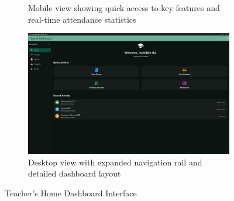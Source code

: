 \begin{figure}[H]
\begin{subfigure}[b]{0.35\textwidth}
        \caption{Mobile view showing quick access to key features and real-time attendance statistics}
    \end{subfigure}
    \hfill
    \begin{subfigure}[b]{0.35\textwidth}
        \includegraphics[width=\textwidth]{images/rachid/teacher-side-home-disktop.png}
        \caption{Desktop view with expanded navigation rail and detailed dashboard layout}
    \end{subfigure}
    \caption{Teacher's Home Dashboard Interface}
    \label{fig:home-interface}
\end{figure}
 


